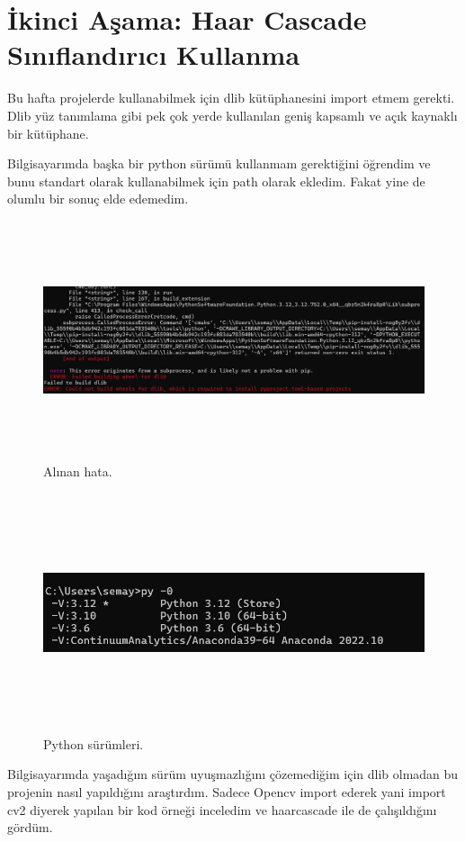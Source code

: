 \documentclass[12pt, a4paper]{article}
\begin{document}
 \section{İkinci Aşama: Haar Cascade Sınıflandırıcı Kullanma} 
 Bu hafta projelerde kullanabilmek için dlib kütüphanesini import etmem gerekti. Dlib yüz tanımlama gibi pek çok yerde kullanılan geniş kapsamlı ve açık kaynaklı bir kütüphane.\par Bilgisayarımda başka bir python sürümü kullanmam gerektiğini öğrendim ve bunu standart olarak kullanabilmek için path olarak ekledim. Fakat yine de olumlu bir sonuç elde edemedim. \begin{figure}[!h]
 	\centering
 	\includegraphics[width=17cm, height=7cm, keepaspectratio]{error.jpg}
 	\caption{Alınan hata.} 
 \end{figure}\par \begin{figure}[!h]
 	\centering
 	\includegraphics[width=17cm, height=7cm, keepaspectratio]{psurumu.jpg}
 	\caption{Python sürümleri.} 
 \end{figure}\par
 Bilgisayarımda yaşadığım sürüm uyuşmazlığını çözemediğim için dlib olmadan bu projenin nasıl yapıldığını araştırdım. Sadece Opencv import ederek yani import cv2 diyerek yapılan bir kod örneği inceledim ve haarcascade ile de çalışıldığını gördüm.\newline
\end{document}
